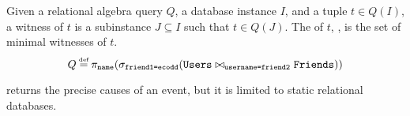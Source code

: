 Given a relational algebra query $Q$, a database instance $I$, and a tuple $t
\in Q(I)$, a witness of $t$ is a subinstance $J \subseteq I$ such that $t \in
Q(J)$. The  of $t$, , is the set of
minimal witnesses of $t$.
%
\[
  Q \defeq \pi_{\texttt{name}}(
    \sigma_{\texttt{friend1=ecodd}}(
      \texttt{Users} \join_{\texttt{username=friend2}} \texttt{Friends}
    )
  )
\]
%


\Whyprovenance{} returns the precise causes of an event, but it is limited to
static relational databases.
